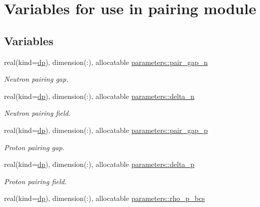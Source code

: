 \hypertarget{group__PAIRING}{}\section{Variables for use in pairing module}
\label{group__PAIRING}
\subsection*{Variables}
\begin{DoxyCompactItemize}
\item 
real(kind=\mbox{\hyperlink{namespaceparameters_a52f8c6351fd79345d8811e065bcbbb37}{dp}}), dimension(\+:), allocatable \mbox{\hyperlink{group__PAIRING_ga2017e6d9cb3446579e4231db5ee50d0c}{parameters\+::pair\+\_\+gap\+\_\+n}}
\begin{DoxyCompactList}\small\item\em Neutron pairing gap. \end{DoxyCompactList}\item 
real(kind=\mbox{\hyperlink{namespaceparameters_a52f8c6351fd79345d8811e065bcbbb37}{dp}}), dimension(\+:), allocatable \mbox{\hyperlink{group__PAIRING_ga1a7cf61c64e34d8c4ff1348bea510826}{parameters\+::delta\+\_\+n}}
\begin{DoxyCompactList}\small\item\em Neutron pairing field. \end{DoxyCompactList}\item 
real(kind=\mbox{\hyperlink{namespaceparameters_a52f8c6351fd79345d8811e065bcbbb37}{dp}}), dimension(\+:), allocatable \mbox{\hyperlink{group__PAIRING_ga80c6085ca6be5adceadc0f7167218231}{parameters\+::pair\+\_\+gap\+\_\+p}}
\begin{DoxyCompactList}\small\item\em Proton pairing gap. \end{DoxyCompactList}\item 
real(kind=\mbox{\hyperlink{namespaceparameters_a52f8c6351fd79345d8811e065bcbbb37}{dp}}), dimension(\+:), allocatable \mbox{\hyperlink{group__PAIRING_gadffdf74625256112759c5d17e8cfeafc}{parameters\+::delta\+\_\+p}}
\begin{DoxyCompactList}\small\item\em Proton pairing field. \end{DoxyCompactList}\item 
real(kind=\mbox{\hyperlink{namespaceparameters_a52f8c6351fd79345d8811e065bcbbb37}{dp}}), dimension(\+:), allocatable \mbox{\hyperlink{group__PAIRING_ga346a8d96825c42b0dcb9763ed8770a68}{parameters\+::rho\+\_\+p\+\_\+bcs}}

\end{DoxyCompactItemize}
